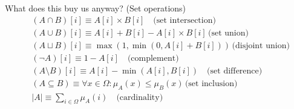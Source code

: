 \documentclass[8pt]{beamer}
\begin{document}
\begin{frame}{What does this buy us anyway? (Set operations)}
\begin{align*} &(A \cap B)[i] \equiv  A[i] \times B[i] \quad \text{(set intersection)} \\
&(A \cup B)[i] \equiv  A[i] + B[i]  - A[i] \times
B[i] \, \text{(set union)}\\ &(A \sqcup B)[i] \equiv  \max(1, \min(0, A[i] +
B[i])) \, \text{(disjoint union)}\\ &(\lnot A)[i] \equiv 1 - A[i] \quad
\text{(complement)}\\ &(A \setminus B)[i] \equiv A[i]  - \min(A[i], B[i]) \quad
\text{(set difference)} \\ &(A \subseteq B) \equiv \forall x \in \Omega:
\mu_A(x) \leq \mu_B(x) \, \text{(set inclusion)}\\ &|A| \equiv \sum_{i \in \Omega} \mu_A (i) \quad \text{(cardinality)} \\
\end{align*}
\end{frame}
\end{document}
